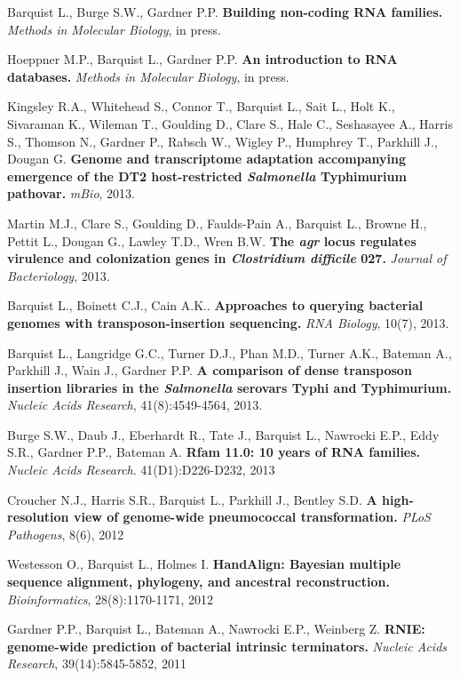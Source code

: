 \item{Barquist L., Burge S.W., Gardner P.P. \textbf{Building non-coding RNA families.} \textit{Methods in Molecular Biology}, in press.} 

\item{Hoeppner M.P., Barquist L., Gardner P.P. \textbf{An introduction to RNA databases.} \textit{Methods in Molecular Biology}, in press.} 

\item{Kingsley R.A., Whitehead S., Connor T., Barquist L., Sait L., Holt K., Sivaraman K., Wileman T., Goulding D., Clare S., Hale C., Seshasayee A., Harris S., Thomson N., Gardner P., Rabsch W., Wigley P., Humphrey T., Parkhill J., Dougan G. \textbf{Genome and transcriptome adaptation accompanying emergence of the DT2 host-restricted \textit{Salmonella} Typhimurium pathovar.}  \textit{mBio}, 2013.}

\item{Martin M.J., Clare S., Goulding D., Faulds-Pain A., Barquist L., Browne H., Pettit L., Dougan G., Lawley T.D.,  Wren B.W. \textbf{The \textit{agr} locus regulates virulence and colonization genes in \textit{Clostridium difficile} 027.} \textit{Journal of Bacteriology}, 2013. }

\item{Barquist L., Boinett C.J., Cain A.K..  \textbf{Approaches to querying bacterial genomes with transposon-insertion sequencing.} \textit{RNA Biology}, 10(7), 2013.}

\item{Barquist L., Langridge G.C., Turner D.J., Phan M.D., Turner A.K., Bateman A., Parkhill J., Wain J., Gardner P.P. \textbf{A comparison of dense transposon insertion libraries in the \textit{Salmonella} serovars Typhi and Typhimurium.} \textit{Nucleic Acids Research}, 41(8):4549-4564, 2013.} 

\item{Burge S.W., Daub J., Eberhardt R., Tate J., Barquist L., Nawrocki E.P., Eddy S.R., Gardner P.P., Bateman A. \textbf{Rfam 11.0: 10 years of RNA families.} \textit{Nucleic Acids Research}. 41(D1):D226-D232, 2013}

\item{Croucher N.J., Harris S.R., Barquist L., Parkhill J., Bentley S.D. \textbf{A high-resolution view of genome-wide pneumococcal transformation.} \textit{PLoS Pathogens}, 8(6), 2012}

\item{Westesson O., Barquist L., Holmes I. \textbf{HandAlign: Bayesian multiple sequence alignment, phylogeny, and ancestral reconstruction.} \textit{Bioinformatics}, 28(8):1170-1171, 2012}

\item{Gardner P.P., Barquist L., Bateman A., Nawrocki E.P., Weinberg Z. \textbf{RNIE: genome-wide prediction of bacterial intrinsic terminators.} \textit{Nucleic Acids Research}, 39(14):5845-5852, 2011}



 


